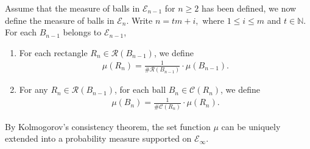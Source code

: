 \documentclass[11pt]{amsart}
\numberwithin{equation}{section}
\newcommand{\0}{\mathbf{0}}
\theoremstyle{remark}
\begin{document}
{Assume that the measure of balls in $\mathcal{E}_{n-1}$ for $n\ge 2$ has been defined, we now define the measure of balls in $\mathcal{E}_{n}$. Write $n=tm+i,$ where $1\le i\le m$ and $t\in\mathbb{N}$. For each $B_{n-1}$ belongs to $\mathcal{E}_{n-1}$,

\begin{enumerate}
    \item For each rectangle $R_{n}\in\mathcal{R}(B_{n-1})$, we define
    \begin{align*}
    \mu({R}_{n})=\frac{1}{\#\mathcal{R}(B_{n-1})}\cdot\mu(B_{n-1}).
    \end{align*}
    \item For any $R_n\in\mathcal{R}(B_{n-1})$, for each ball $B_n\in\mathcal{C}(R_n)$, we define
    \begin{align*}
        \mu({B}_{n})=\frac{1}{\#{\mathcal{C}}({R}_n)}\cdot\mu(R_n).
    \end{align*}
\end{enumerate}
By Kolmogorov's consistency theorem, the set function $\mu$ can be uniquely extended into a probability measure supported on $\mathcal{E}_{\infty}$. 

}
\end{document}
